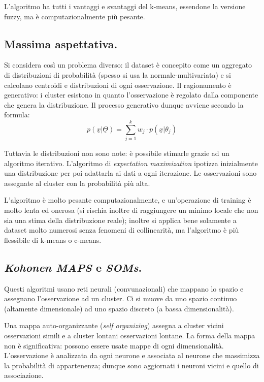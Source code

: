 \documentclass[11pt, a4page, twocolumn]{article}
\begin{document}
L'algoritmo ha tutti i vantaggi e svantaggi del k-means, essendone la versione fuzzy, ma è computazionalmente più pesante.

\subsection{Massima aspettativa.}
Si considera così un problema diverso: il dataset è concepito come un aggregato di distribuzioni di probabilità (spesso si usa la normale-multivariata) e si calcolano centroidi e distribuzioni di ogni osservazione.
Il ragionamento è generativo: i cluster esistono in quanto l'osservazione è regolato dalla componente che genera la distribuzione.
Il processo generativo dunque avviene secondo la formula:
\begin{equation*}
p(\underline{x}|\underline{\Theta}) = \sum^k_{j=1}{w_j \cdot p(\underline{x}|\theta_j)}
\end{equation*}

Tuttavia le distribuzioni non sono note: è possibile stimarle grazie ad un algoritmo iterativo.
L'algoritmo di \textit{expectation maximization} ipotizza inizialmente una distribuzione per poi adattarla ai dati a ogni iterazione.
Le osservazioni sono assegnate al cluster con la probabilità più alta.

L'algoritmo è molto pesante computazionalmente, e un'operazione di training è molto lenta ed onerosa (si rischia inoltre di raggiungere un minimo locale che non sia una stima della distribuzione reale); inoltre si applica bene solamente a dataset molto numerosi senza fenomeni di collinearità, ma l'algoritmo è più flessibile di k-means o c-means.

\subsection{\textit{Kohonen MAPS} e \textit{SOMs}.}
Questi algoritmi usano reti neurali (convunazionali) che mappano lo spazio e assegnano l'osservazione ad un cluster.
Ci si muove da uno spazio continuo (altamente dimensionale) ad uno spazio discreto (a bassa dimensionalità).

Una mappa auto-organizzante (\textit{self organizing}) assegna a cluster vicini osservazioni simili e a cluster lontani osservazioni lontane.
La forma della mappa non è significativa: possono essere usate mappe di ogni dimensionalità.
L'osservazione è analizzata da ogni neurone e associata al neurone che massimizza la probabilità di appartenenza; dunque sono aggiornati i neuroni vicini e quello di associazione.
\end{document}
